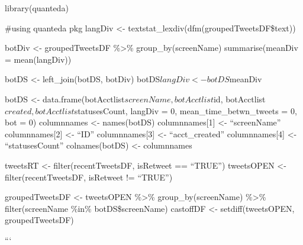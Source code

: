 \documentclass[]{article}
\begin{document}
library(quanteda)

\#using quanteda pkg langDiv \textless{}-
textstat\_lexdiv(dfm(groupedTweetsDF\$text))

botDiv \textless{}- groupedTweetsDF \%\textgreater{}\%
group\_by(screenName) summarise(meanDiv = mean(langDiv))

botDS \textless{}- left\_join(botDS, botDiv)
botDS\(langDiv <- botDS\)meanDiv

botDS \textless{}- data.frame(botAcctlist\(screenName, botAcctlist\)id,
botAcctlist\(created,  botAcctlist\)statusesCount, langDiv = 0,
mean\_time\_betwn\_tweets = 0, bot = 0) columnnames \textless{}-
names(botDS) columnnames{[}1{]} \textless{}- ``screenName''
columnnames{[}2{]} \textless{}- ``ID'' columnnames{[}3{]} \textless{}-
``acct\_created'' columnnames{[}4{]} \textless{}- ``statusesCount''
colnames(botDS) \textless{}- columnnames

tweetsRT \textless{}- filter(recentTweetsDF, isRetweet == ``TRUE'')
tweetsOPEN \textless{}- filter(recentTweetsDF, isRetweet != ``TRUE'')

groupedTweetsDF \textless{}- tweetsOPEN \%\textgreater{}\%
group\_by(screenName) \%\textgreater{}\% filter(screenName \%in\%
botDS\$screenName) castoffDF \textless{}- setdiff(tweetsOPEN,
groupedTweetsDF)

```
\end{document}
